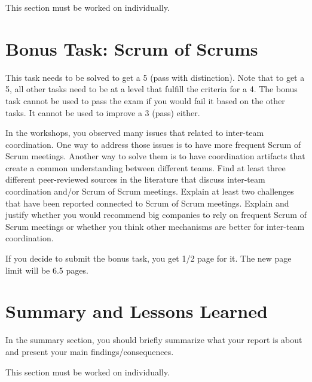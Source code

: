 \documentclass[conference]{IEEEtran}
\begin{document}
This section must be worked on individually.

\section{Bonus Task: Scrum of Scrums}
\label{sec:bonus_task}
This task needs to be solved to get a 5 (pass with distinction).
Note that to get a 5, all other tasks need to be at a level that fulfill the criteria for a 4.
The bonus task cannot be used to pass the exam if you would fail it based on the other tasks.
It cannot be used to improve a 3 (pass) either.

In the workshops, you observed many issues that related to inter-team coordination. One way to address those issues is to have more frequent Scrum of Scrum meetings. Another way to solve them is to have coordination artifacts that create a common understanding between different teams. Find at least three different peer-reviewed sources in the literature that discuss inter-team coordination and/or Scrum of Scrum meetings. Explain at least two challenges that have been reported connected to Scrum of Scrum meetings. Explain and justify whether you would recommend big companies to rely on frequent Scrum of Scrum meetings or whether you think other mechanisms are better for inter-team coordination. 


If you decide to submit the bonus task, you get 1/2 page for it. The new page limit will be 6.5 pages.
\section{Summary and Lessons Learned}
\label{sec:summary}
In the summary section, you should briefly summarize what your report is about and present your main findings/consequences.

This section must be worked on individually.





%	
%	
%	
%	
\end{document}
